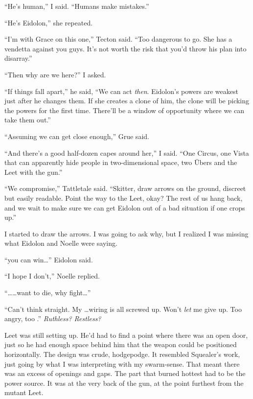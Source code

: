 ``He's human,'' I said.  ``Humans make mistakes.''



``He's Eidolon,'' she repeated.



``I'm with Grace on this one,'' Tecton said.  ``Too dangerous to go.  She has a vendetta against you guys.  It's not worth the risk that you'd throw his plan into disarray.''



``Then why are we here?'' I asked.



``If things fall apart,'' he said, ``We can act \emph{then}.  Eidolon's powers are weakest just after he changes them.  If she creates a clone of him, the clone will be picking the powers for the first time.  There'll be a window of opportunity where we can take them out.''



``Assuming we can get close enough,'' Grue said.



``And there's a good half-dozen capes around her,'' I said.  ``One Circus, one Vista that can apparently hide people in two-dimensional space, two \"{U}bers and the Leet with the gun.''



``We compromise,'' Tattletale said.  ``Skitter, draw arrows on the ground, discreet but easily readable.  Point the way to the Leet, okay?  The rest of us hang back, and we wait to make sure we can get Eidolon out of a bad situation if one crops up.''



I started to draw the arrows.  I was going to ask why, but I realized I was missing what Eidolon and Noelle were saying.



``\ldotsthink you can win\ldots'' Eidolon said.



``I hope I don't,'' Noelle replied.



``\ldots \ldots want to die, why fight\ldots''



``Can't think straight.  My \ldots wiring is all screwed up.  Won't \emph{let} me give up.  Too angry, too \ldotsless.''  \emph{Ruthless? Restless?}



Leet was still setting up.  He'd had to find a point where there was an open door, just so he had enough space behind him that the weapon could be positioned horizontally.  The design was crude, hodgepodge.  It resembled Squealer's work, just going by what I was interpreting with my swarm-sense.  That meant there was an excess of openings and gaps.  The part that burned hottest had to be the power source.  It was at the very back of the gun, at the point furthest from the mutant Leet.



